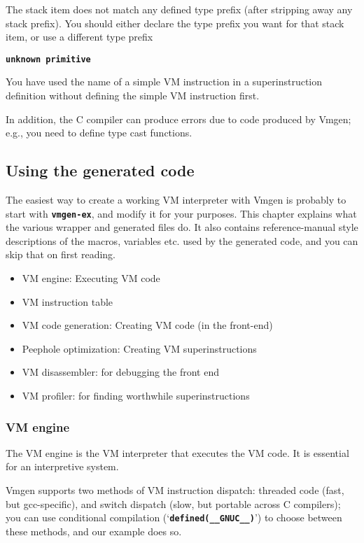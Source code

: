 \documentclass[10pt,english]{article}
\begin{document}
The stack item does not match any defined type prefix (after stripping
away any stack prefix). You should either declare the type prefix
you want for that stack item, or use a different type prefix

\texttt{\textbf{unknown primitive}}

You have used the name of a simple VM instruction in a superinstruction
definition without defining the simple VM instruction first.

In addition, the C compiler can produce errors due to code produced
by Vmgen; e.g., you need to define type cast functions.


\subsection{Using the generated code}

The easiest way to create a working VM interpreter with Vmgen is probably
to start with \texttt{\textbf{vmgen-ex}}, and modify it for your purposes.
This chapter explains what the various wrapper and generated files
do. It also contains reference-manual style descriptions of the macros,
variables etc. used by the generated code, and you can skip that on
first reading.
\begin{itemize}
\item VM engine: Executing VM code
\item VM instruction table
\item VM code generation: Creating VM code (in the front-end)
\item Peephole optimization: Creating VM superinstructions
\item VM disassembler: for debugging the front end
\item VM profiler: for finding worthwhile superinstructions
\end{itemize}

\subsubsection{VM engine\label{sub:VM-engine}}

The VM engine is the VM interpreter that executes the VM code. It
is essential for an interpretive system.

Vmgen supports two methods of VM instruction dispatch: threaded code
(fast, but gcc-specific), and switch dispatch (slow, but portable
across C compilers); you can use conditional compilation (\textquoteleft{}\texttt{\textbf{defined(\_\_GNUC\_\_)}}\textquoteright{})
to choose between these methods, and our example does so.
\end{document}
